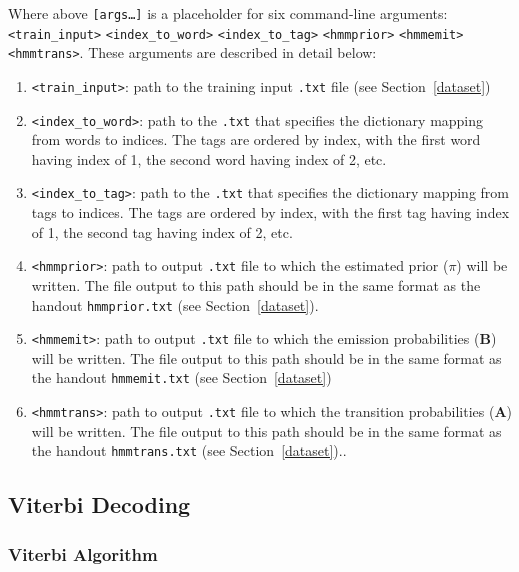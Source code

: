 \documentclass{article}
\begin{document}
Where above \texttt{[args\dots]} is a placeholder for six command-line arguments:\texttt{<train\_input>} \texttt{<index\_to\_word>} \texttt{<index\_to\_tag>} \texttt{<hmmprior>} \texttt{<hmmemit>} \texttt{<hmmtrans>}. These arguments are described in detail below:
\begin{enumerate}
    \item \texttt{<train\_input>}: path to the training input \texttt{.txt} file (see Section~\ref{dataset})
    \item \texttt{<index\_to\_word>}: path to the \texttt{.txt} that specifies the dictionary mapping from words to indices. The tags are ordered by index, with the first word having index of 1, the second word having index of 2, etc.
    \item \texttt{<index\_to\_tag>}: path to the \texttt{.txt} that specifies the dictionary mapping from tags to indices. The tags are ordered by index, with the first tag having index of 1, the second tag having index of 2, etc.
    \item \texttt{<hmmprior>}: path to output \texttt{.txt} file to which the estimated prior (\boldmath${\pi}$) will be written. The file output to this path should be in the same format as the handout \texttt{hmmprior.txt} (see Section~\ref{dataset}).
    \item \texttt{<hmmemit>}: path to output \texttt{.txt} file to which the emission probabilities ($\mathbf B$) will be written. The file output to this path should be in the same format as the handout \texttt{hmmemit.txt} (see Section~\ref{dataset})
    \item \texttt{<hmmtrans>}: path to output \texttt{.txt} file to which the transition probabilities ($\mathbf A$) will be written. The file output to this path should be in the same format as the handout \texttt{hmmtrans.txt} (see Section~\ref{dataset})..
\end{enumerate}


\subsection{Viterbi Decoding}
\label{viterbi}

\subsubsection{Viterbi Algorithm}
\end{document}
